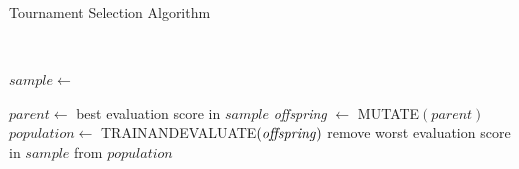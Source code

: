 	\begin{algorithm}[H]\label{alg:GA1}
		\caption{Tournament Selection Algorithm}

		\SetAlgoLined
		\
		

		{

			{
				$sample \leftarrow$ \;	
			
			}

			$parent \leftarrow$ best evaluation score in $sample$\;
			\textit{offspring} $\leftarrow$	MUTATE$(parent)$\;	
			$population \leftarrow$ TRAINANDEVALUATE$(\text{\textit{offspring}})$\;
			remove worst evaluation score in $sample$ from $population$\;

		}
		\;

		
	\end{algorithm}





